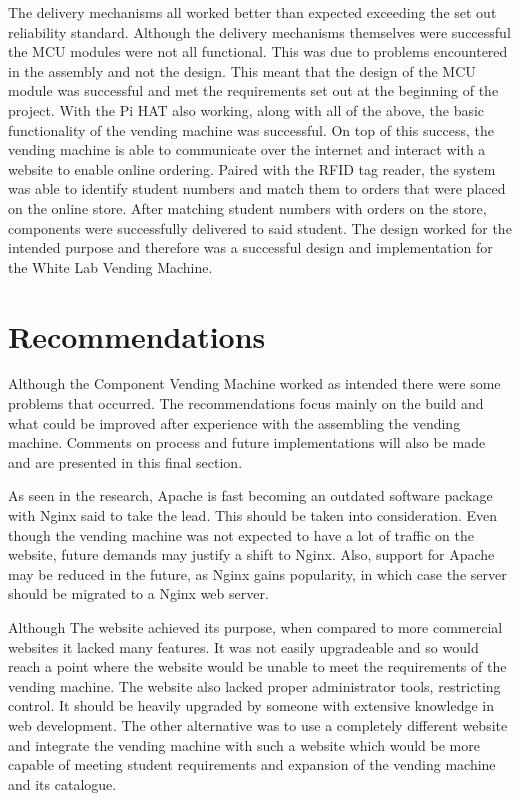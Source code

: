 \documentclass[a4paper,11pt]{article}
\numberwithin{figure}{section}
\numberwithin{table}{section}
\begin{document}
The delivery mechanisms all worked better than expected exceeding the set out reliability standard. Although the delivery mechanisms themselves were successful the MCU modules were not all functional. This was due to problems encountered in the assembly and not the design. This meant that the design of the MCU module was successful and met the requirements set out at the beginning of the project. With the Pi HAT also working, along with all of the above, the basic functionality of the vending machine was successful. On top of this success, the vending machine is able to communicate over the internet and interact with a website to enable online ordering. Paired with the RFID tag reader, the system was able to identify student numbers and match them to orders that were placed on the online store. After matching student numbers with orders on the store, components were successfully delivered to said student. The design worked for the intended purpose and therefore was a successful design and implementation for the White Lab Vending Machine.

\newpage

\section{Recommendations}\thispagestyle{sectionstart}
Although the Component Vending Machine worked as intended there were some problems that occurred. The recommendations focus mainly on the build and what could be improved after experience with the assembling the vending machine. Comments on process and future implementations will also be made and are presented in this final section.

As seen in the research, Apache is fast becoming an outdated software package with Nginx said to take the lead. This should be taken into consideration. Even though the vending machine was not expected to have a lot of traffic on the website, future demands may justify a shift to Nginx. Also, support for Apache may be reduced in the future, as Nginx gains popularity, in which case the server should be migrated to a Nginx web server. 

Although The website achieved its purpose, when compared to more commercial websites it lacked many features. It was not easily upgradeable and so would reach a point where the website would be unable to meet the requirements of the vending machine. The website also lacked proper administrator tools, restricting control. It should be heavily upgraded by someone with extensive knowledge in web development. The other alternative was to use a completely different website and integrate the vending machine with such a website which would be more capable of meeting student requirements and expansion of the vending machine and its catalogue.
\end{document}
